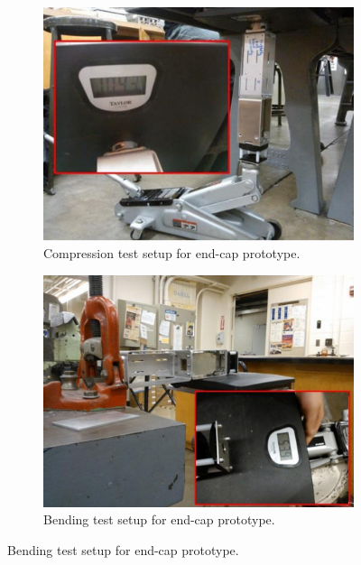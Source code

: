 \documentclass[12pt]{report}
\begin{document}
\begin{figure}[hbt]
  \begin{center}
    \begin{subfigure}[b]{0.45\textwidth}
      \includegraphics[width=1\textwidth]{./img/compression_test.jpg}
      \caption{Compression test setup for end-cap prototype.~\cite{sabelhaus2014hardware}}
      \label{endcap_compression_test_experimental}
    \end{subfigure}
    \begin{subfigure}[b]{0.45\textwidth}
      \includegraphics[width=1\textwidth]{./img/bending_test.jpg}
      \caption{Bending test setup for end-cap prototype.~\cite{sabelhaus2014hardware}}
      \label{endcap_bending_test_experimental}
    \end{subfigure}
  \end{center}
\end{figure}
\end{document}
